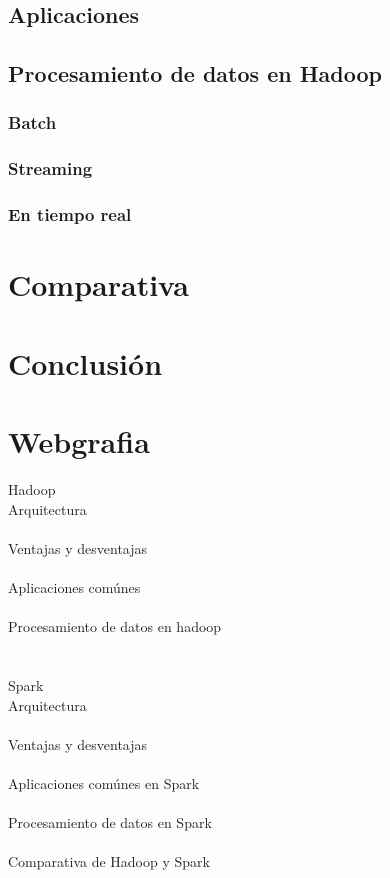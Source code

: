 \documentclass[12pt]{article}
\begin{document}
\subsection{Aplicaciones}

\subsection{Procesamiento de datos en Hadoop}
\subsubsection{Batch}
\subsubsection{Streaming}
\subsubsection{En tiempo real}

\section{Comparativa}

\clearpage

\section{Conclusión}


\clearpage

\section{Webgrafia}


Hadoop
\\
Arquitectura
\\
\cite{aprenderbigdata-hadoop}
\cite{ionos-hadoop}
\\
Ventajas y desventajas
\\
\cite{hostzealot-hadoop}
\cite{jacagudelo-hadoop}
\\
Aplicaciones comúnes
\\
\cite{powerdata-hadoop}
\\
Procesamiento de datos en hadoop
\\
\cite{deusto-hadoop}
\\
\\
Spark
\\
Arquitectura
\\
\cite{keepcoding-spark}
\cite{medium-spark}
\\
Ventajas y desventajas
\\
\cite{bbvaapimarket-spark}
\cite{ionos-spark}
\\
Aplicaciones comúnes en Spark
\\
\cite{googleCloud-spark}
\\
Procesamiento de datos en Spark
\\
\cite{diegocalvo-spark}
\\

Comparativa de Hadoop y Spark
\\
\cite{aws-hadoop-spark}
\cite{esic-hadoop-spark}
\cite{inesdi-hadoop-spark}


\printbibliography
\end{document}

